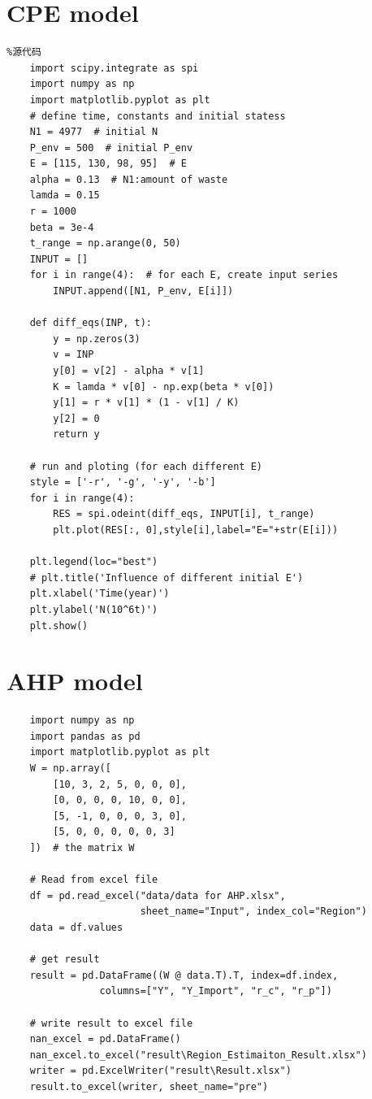 \documentclass{mcmthesis}
\begin{document}



\newpage
\begin{appendices}

\section{CPE model}
\begin{lstlisting}%源代码	
	import scipy.integrate as spi
	import numpy as np
	import matplotlib.pyplot as plt
	# define time, constants and initial statess
	N1 = 4977  # initial N
	P_env = 500  # initial P_env
	E = [115, 130, 98, 95]  # E
	alpha = 0.13  # N1:amount of waste
	lamda = 0.15
	r = 1000
	beta = 3e-4
	t_range = np.arange(0, 50)
	INPUT = []
	for i in range(4):  # for each E, create input series
		INPUT.append([N1, P_env, E[i]])

	def diff_eqs(INP, t):
		y = np.zeros(3)
		v = INP
		y[0] = v[2] - alpha * v[1]
		K = lamda * v[0] - np.exp(beta * v[0])
		y[1] = r * v[1] * (1 - v[1] / K)
		y[2] = 0
		return y
	
	# run and ploting (for each different E)
	style = ['-r', '-g', '-y', '-b']
	for i in range(4):
		RES = spi.odeint(diff_eqs, INPUT[i], t_range)
		plt.plot(RES[:, 0],style[i],label="E="+str(E[i]))
	
	plt.legend(loc="best")
	# plt.title('Influence of different initial E')
	plt.xlabel('Time(year)')
	plt.ylabel('N(10^6t)')
	plt.show()
\end{lstlisting}
\newpage
\section{AHP model}
\begin{lstlisting}
	import numpy as np
	import pandas as pd
	import matplotlib.pyplot as plt
	W = np.array([
		[10, 3, 2, 5, 0, 0, 0],
		[0, 0, 0, 0, 10, 0, 0],
		[5, -1, 0, 0, 0, 3, 0],
		[5, 0, 0, 0, 0, 0, 3]
	])  # the matrix W

	# Read from excel file
	df = pd.read_excel("data/data for AHP.xlsx",
					   sheet_name="Input", index_col="Region")
	data = df.values
	
	# get result
	result = pd.DataFrame((W @ data.T).T, index=df.index,
				columns=["Y", "Y_Import", "r_c", "r_p"])
	
	# write result to excel file
	nan_excel = pd.DataFrame()
	nan_excel.to_excel("result\Region_Estimaiton_Result.xlsx")
	writer = pd.ExcelWriter("result\Result.xlsx")
	result.to_excel(writer, sheet_name="pre")


\end{lstlisting}
\end{appendices}
\end{document}

